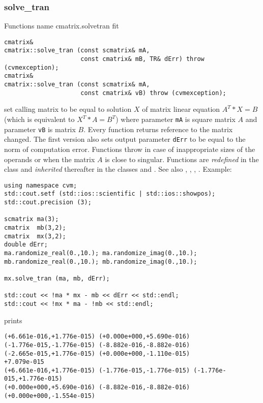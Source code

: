 \subsubsection{solve\_tran}
Functions%
\pdfdest name {cmatrix.solvetran} fit
\begin{verbatim}
cmatrix&
cmatrix::solve_tran (const scmatrix& mA,
                     const cmatrix& mB, TR& dErr) throw (cvmexception);
cmatrix&
cmatrix::solve_tran (const scmatrix& mA,
                     const cmatrix& vB) throw (cvmexception);
\end{verbatim}
set calling matrix to be equal to  solution $X$ of 
matrix linear equation
$A^T*X=B$ (which is equivalent to $X^T*A=B^T$)
where parameter \verb"mA" is square matrix $A$
and parameter \verb"vB" is matrix $B$.
Every function returns  reference to the matrix changed.
The first version also sets  output parameter \verb"dErr" to be equal
to the norm of computation error.
Functions throw 
in case of inappropriate sizes
of the operands or when the matrix $A$ is close to singular.
Functions are \emph{redefined} in  the class
 and
\emph{inherited} thereafter in the classes
 and
.
See also
,
,
,
.
Example:
\begin{Verbatim}
using namespace cvm;
std::cout.setf (std::ios::scientific | std::ios::showpos); 
std::cout.precision (3);

scmatrix ma(3);
cmatrix  mb(3,2);
cmatrix  mx(3,2);
double dErr;
ma.randomize_real(0.,10.); ma.randomize_imag(0.,10.);
mb.randomize_real(0.,10.); mb.randomize_imag(0.,10.);

mx.solve_tran (ma, mb, dErr);

std::cout << !ma * mx - mb << dErr << std::endl;
std::cout << !mx * ma - !mb << std::endl;
\end{Verbatim}
prints
\begin{Verbatim}
(+6.661e-016,+1.776e-015) (+0.000e+000,+5.690e-016)
(-1.776e-015,-1.776e-015) (-8.882e-016,-8.882e-016)
(-2.665e-015,+1.776e-015) (+0.000e+000,-1.110e-015)
+7.079e-015
(+6.661e-016,+1.776e-015) (-1.776e-015,-1.776e-015) (-1.776e-015,+1.776e-015)
(+0.000e+000,+5.690e-016) (-8.882e-016,-8.882e-016) (+0.000e+000,-1.554e-015)
\end{Verbatim}
\newpage





